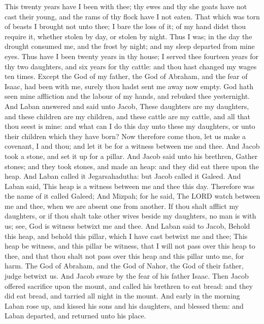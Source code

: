 \begin{biblechapter}
\verse This twenty years have I been with thee; thy ewes and thy she goats have not cast their young, and the rams of thy flock have I not eaten.
\verse That which was torn of beasts I brought not unto thee; I bare the loss of it; of my hand didst thou require it, whether stolen by day, or stolen by night.
\verse Thus I was; in the day the drought consumed me, and the frost by night; and my sleep departed from mine eyes.
\verse Thus have I been twenty years in thy house; I served thee fourteen years for thy two daughters, and six years for thy cattle: and thou hast changed my wages ten times.
\verse Except the God of my father, the God of Abraham, and the fear of Isaac, had been with me, surely thou hadst sent me away now empty. God hath seen mine affliction and the labour of my hands, and rebuked thee yesternight.
\verse And Laban answered and said unto Jacob, These daughters are my daughters, and these children are my children, and these cattle are my cattle, and all that thou seest is mine: and what can I do this day unto these my daughters, or unto their children which they have born?
\verse Now therefore come thou, let us make a covenant, I and thou; and let it be for a witness between me and thee.
\verse And Jacob took a stone, and set it up for a pillar.
\verse And Jacob said unto his brethren, Gather stones; and they took stones, and made an heap: and they did eat there upon the heap.
\verse And Laban called it Jegarsahadutha: but Jacob called it Galeed.
\verse And Laban said, This heap is a witness between me and thee this day. Therefore was the name of it called Galeed;
\verse And Mizpah; for he said, The LORD watch between me and thee, when we are absent one from another.
\verse If thou shalt afflict my daughters, or if thou shalt take other wives beside my daughters, no man is with us; see, God is witness betwixt me and thee.
\verse And Laban said to Jacob, Behold this heap, and behold this pillar, which I have cast betwixt me and thee;
\verse This heap be witness, and this pillar be witness, that I will not pass over this heap to thee, and that thou shalt not pass over this heap and this pillar unto me, for harm.
\verse The God of Abraham, and the God of Nahor, the God of their father, judge betwixt us. And Jacob sware by the fear of his father Isaac.
\verse Then Jacob offered sacrifice upon the mount, and called his brethren to eat bread: and they did eat bread, and tarried all night in the mount.
\verse And early in the morning Laban rose up, and kissed his sons and his daughters, and blessed them: and Laban departed, and returned unto his place.
\end{biblechapter}

